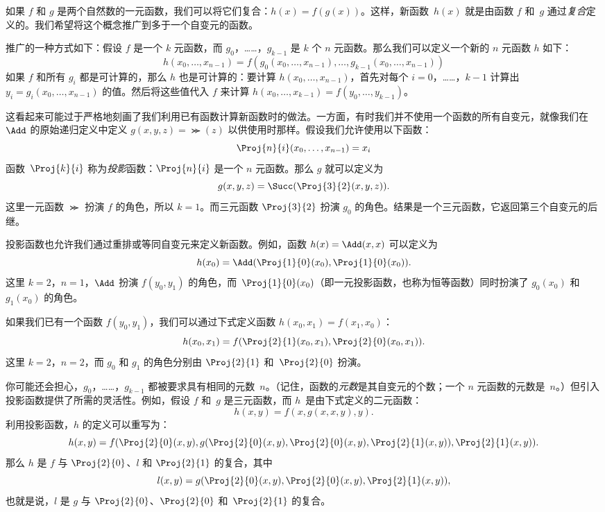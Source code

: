 \documentclass[../../../include/open-logic-section]{subfiles}
\begin{document}

如果 $f$ 和 $g$ 是两个自然数的一元函数，我们可以将它们复合：$h(x) = f(g(x))$。这样，新函数~$h(x)$ 就是由函数 $f$ 和~$g$ 通过\emph{复合}定义的。我们希望将这个概念推广到多于一个自变元的函数。

推广的一种方式如下：假设 $f$ 是一个 $k$ 元函数，而 $g_0$，……，$g_{k-1}$ 是 $k$ 个 $n$ 元函数。那么我们可以定义一个新的 $n$ 元函数 $h$ 如下：
\[
h(x_0, \dots, x_{n-1}) =
f(g_0(x_0, \dots, x_{n-1}), \dots, g_{k-1}(x_0, \dots, x_{n-1}))
\]
如果 $f$ 和所有 $g_i$ 都是可计算的，那么 $h$ 也是可计算的：要计算 $h(x_0,
\dots, x_{n-1})$，首先对每个 $i = 0$，……，$k-1$ 计算出 $y_i = g_i(x_0, \dots,
x_{n-1})$ 的值。然后将这些值代入 $f$ 来计算 $h(x_0, \dots, x_{k-1}) = f(y_0, \dots, y_{k-1})$。

这看起来可能过于严格地刻画了我们利用已有函数计算新函数时的做法。一方面，有时我们并不使用一个函数的所有自变元，就像我们在~$\Add$ 的原始递归定义中定义 $g(x, y, z) = \Succ(z)$ 以供使用时那样。假设我们允许使用以下函数：
\[
\Proj{n}{i}(x_0, \dots, x_{n-1}) = x_i
\]
函数~$\Proj{k}{i}$ 称为\emph{投影}函数：$\Proj{n}{i}$ 是一个 $n$ 元函数。那么 $g$ 就可以定义为
\[
g(x, y, z) = \Succ(\Proj{3}{2}(x, y, z)).
\]
这里一元函数 $\Succ$ 扮演 $f$ 的角色，所以 $k=1$。而三元函数 $\Proj{3}{2}$ 扮演 $g_0$ 的角色。结果是一个三元函数，它返回第三个自变元的后继。

投影函数也允许我们通过重排或等同自变元来定义新函数。例如，函数 $h(x)
= \Add(x, x)$ 可以定义为
\[
h(x_0) = \Add(\Proj{1}{0}(x_0),\Proj{1}{0}(x_0)).
\]
这里 $k=2$，$n=1$，$\Add$ 扮演 $f(y_0,y_1)$ 的角色，而~$\Proj{1}{0}(x_0)$（即一元投影函数，也称为恒等函数）同时扮演了 $g_0(x_0)$ 和 $g_1(x_0)$ 的角色。

如果我们已有一个函数 $f(y_0, y_1)$，我们可以通过下式定义函数 $h(x_0, x_1) = f(x_1, x_0)$：
\[
h(x_0, x_1) = f(\Proj{2}{1}(x_0, x_1),\Proj{2}{0}(x_0, x_1)).
\]
这里 $k=2$，$n = 2$，而 $g_0$ 和 $g_1$ 的角色分别由 $\Proj{2}{1}$ 和~$\Proj{2}{0}$ 扮演。

你可能还会担心，$g_0$，……，$g_{k-1}$ 都被要求具有相同的元数~$n$。（记住，函数的\emph{元数}是其自变元的个数；一个 $n$ 元函数的元数是~$n$。）但引入投影函数提供了所需的灵活性。例如，假设 $f$ 和~$g$ 是三元函数，而 $h$~是由下式定义的二元函数：
\[
h(x,y) = f(x,g(x,x,y),y).
\]
利用投影函数，$h$ 的定义可以重写为：
\[
h(x,y) = f(\Proj{2}{0}(x,y), g(\Proj{2}{0}(x,y), \Proj{2}{0}(x,y),
\Proj{2}{1}(x,y)), \Proj{2}{1}(x,y)).
\]
那么 $h$ 是 $f$ 与 $\Proj{2}{0}$、$l$ 和 $\Proj{2}{1}$ 的复合，其中
\[
l(x,y) = g(\Proj{2}{0}(x,y),\Proj{2}{0}(x,y),\Proj{2}{1}(x,y)),
\]
也就是说，$l$ 是 $g$ 与 $\Proj{2}{0}$、$\Proj{2}{0}$ 和~$\Proj{2}{1}$ 的复合。
\end{document}
